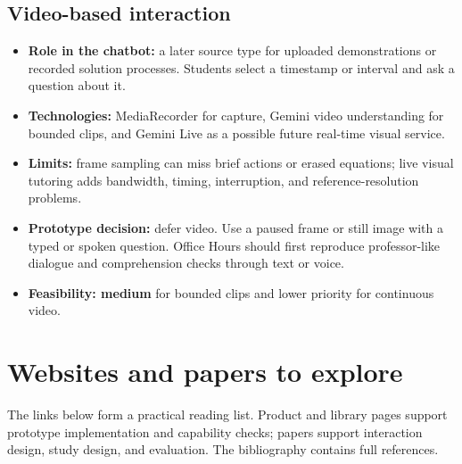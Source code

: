 \documentclass[11pt]{article}
\begin{document}
\subsection{Video-based interaction}
\begin{itemize}
\item \textbf{Role in the chatbot:} a later source type for uploaded demonstrations or recorded solution processes. Students select a timestamp or interval and ask a question about it.
\item \textbf{Technologies:} MediaRecorder for capture, Gemini video understanding for bounded clips, and Gemini Live as a possible future real-time visual service.\cite{recorder,video,live}
\item \textbf{Limits:} frame sampling can miss brief actions or erased equations; live visual tutoring adds bandwidth, timing, interruption, and reference-resolution problems.
\item \textbf{Prototype decision:} defer video. Use a paused frame or still image with a typed or spoken question. Office Hours should first reproduce professor-like dialogue and comprehension checks through text or voice.
\item \textbf{Feasibility: medium} for bounded clips and lower priority for continuous video.
\end{itemize}

\section{Websites and papers to explore}
The links below form a practical reading list. Product and library pages support prototype implementation and capability checks; papers support interaction design, study design, and evaluation. The bibliography contains full references.
\end{document}
